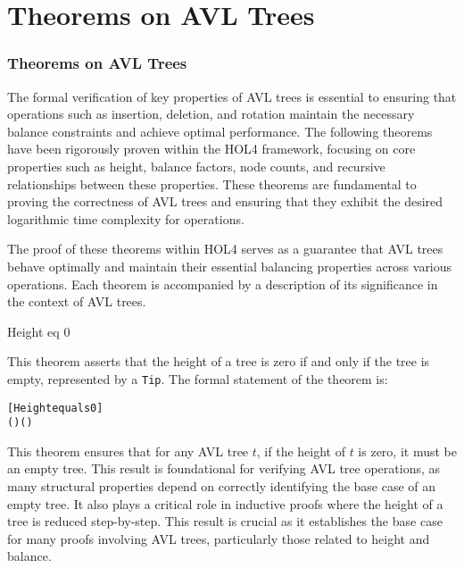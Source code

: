 \chapter{Theorems on AVL Trees}\label{chap:content}


\subsection{Theorems on AVL Trees}

The formal verification of key properties of AVL trees is essential to ensuring that operations such as insertion, deletion, and rotation maintain the necessary balance constraints and achieve optimal performance. The following theorems have been rigorously proven within the HOL4 framework, focusing on core properties such as height, balance factors, node counts, and recursive relationships between these properties. These theorems are fundamental to proving the correctness of AVL trees and ensuring that they exhibit the desired logarithmic time complexity for operations.

The proof of these theorems within HOL4 serves as a guarantee that AVL trees behave optimally and maintain their essential balancing properties across various operations. Each theorem is accompanied by a description of its significance in the context of AVL trees.

	
	\begin{thm}{Height eq 0}

    This theorem asserts that the height of a tree is zero if and only if the tree is empty, represented by a \texttt{Tip}. The formal statement of the theorem is:

    \begin{alltt}
    	[Height equals 0]
    	\HOLTokenTurnstile{} (  \HOLSymConst{=}  \HOLSymConst{\HOLTokenEquiv{}}  \HOLSymConst{=} ) \HOLSymConst{\HOLTokenConj{}} ( \HOLSymConst{=}   \HOLSymConst{\HOLTokenEquiv{}}  \HOLSymConst{=} )
    \end{alltt}
    
    
    \end{thm}

    This theorem ensures that for any AVL tree \(t\), if the height of \(t\) is zero, it must be an empty tree. This result is foundational for verifying AVL tree operations, as many structural properties depend on correctly identifying the base case of an empty tree. It also plays a critical role in inductive proofs where the height of a tree is reduced step-by-step. This result is crucial as it establishes the base case for many proofs involving AVL trees, particularly those related to height and balance.

